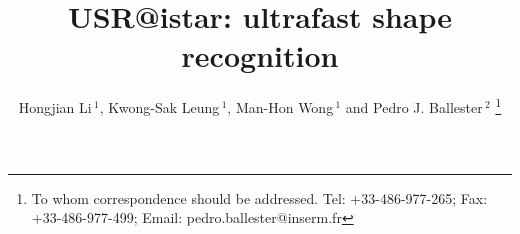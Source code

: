 \documentclass[a4,center,fleqn]{NAR}
\begin{document}
\title{USR@istar: ultrafast shape recognition}

\author{
Hongjian Li\,$^{1}$,
Kwong-Sak Leung\,$^{1}$,
Man-Hon Wong\,$^{1}$
and Pedro J. Ballester\,$^{2}$
\footnote{To whom correspondence should be addressed.
Tel: +33-486-977-265; Fax: +33-486-977-499; Email: pedro.ballester@inserm.fr}}

\address{
$^{1}$Department of Computer Science and Engineering, Chinese University of Hong Kong, Sha Tin, New Territories, Hong Kong
and
$^{2}$Cancer Research Center of Marseille, INSERM U1068, F-13009, Marseille, France. Institut Paoli-Calmettes, F-13009, Marseille, France. Aix-Marseille Université, F-13284, Marseille, France. CNRS UMR7258, F-13009, Marseille, France.}


\maketitle
\end{document}
